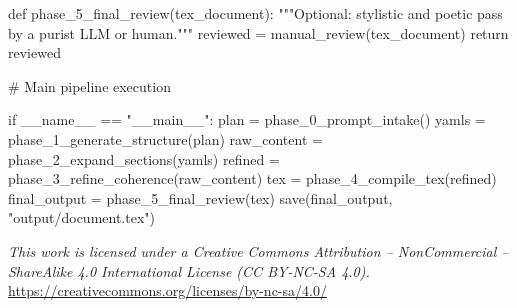 \documentclass[12pt,a4paper]{article}
\begin{document}
\begin{metaoutput}
def phase_5_final_review(tex_document):
    """Optional: stylistic and poetic pass by a purist LLM or human."""
    reviewed = manual_review(tex_document)
    return reviewed

# Main pipeline execution

if __name__ == "__main__":
    plan = phase_0_prompt_intake()
    yamls = phase_1_generate_structure(plan)
    raw_content = phase_2_expand_sections(yamls)
    refined = phase_3_refine_coherence(raw_content)
    tex = phase_4_compile_tex(refined)
    final_output = phase_5_final_review(tex)
    save(final_output, "output/document.tex")			
			\end{metaoutput}
\noindent
\textit{This work is licensed under a Creative Commons Attribution – NonCommercial – ShareAlike 4.0 International License (CC BY-NC-SA 4.0).}\\
\url{https://creativecommons.org/licenses/by-nc-sa/4.0/}			
		
\end{document}
